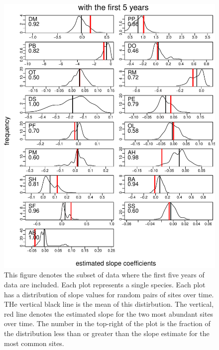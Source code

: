 \documentclass[]{article}
\begin{document}
\begin{figure}[htbp]
\centering
\includegraphics{Empirical_Investigation_files/figure-latex/unnamed-chunk-2-1.pdf}
\caption{This figure denotes the subset of data where the first five
years of data are included. Each plot represents a single species. Each
plot has a distribution of slope values for random pairs of sites over
time. THe vertical black line is the mean of this distirbution. The
vertical, red line denotes the estimated slope for the two most abundant
sites over time. The number in the top-right of the plot is the fraction
of the distribution less than or greater than the slope estimate for the
most common sites.\label{fig:common_vs_random_with5}}
\end{figure}
\end{document}
